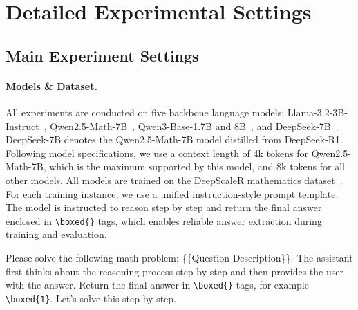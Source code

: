\section{Detailed Experimental Settings} 
\label{app:details}  
\subsection{Main Experiment Settings}
\paragraph{Models \& Dataset.} All experiments are conducted on five backbone language models: Llama-3.2-3B-Instruct~\citep{grattafiori2024llama3herdmodels}, Qwen2.5-Math-7B~\citep{yang2024qwen25mathtechnicalreportmathematical}, Qwen3-Base-1.7B and 8B~\citep{yang2025qwen3technicalreport}, and DeepSeek-7B~\citep{shao2024deepseekmathpushinglimitsmathematical}. DeepSeek-7B denotes the Qwen2.5-Math-7B model distilled from DeepSeek-R1. Following model specifications, we use a context length of 4k tokens for Qwen2.5-Math-7B, which is the maximum supported by this model, and 8k tokens for all other models. All models are trained on the DeepScaleR mathematics dataset~\citep{sun2025improvingdataefficiencyllm}. For each training instance, we use a unified instruction-style prompt template. The model is instructed to reason step by step and return the final answer enclosed in \verb|\boxed{}| tags, which enables reliable answer extraction during training and evaluation.  
\begin{tcolorbox}[ colback=gray!5, colframe=black, coltitle=white, title=\textbf{Prompt Template}, fonttitle=\bfseries, arc=6pt, boxrule=1pt, left=8pt, right=8pt, top=6pt, bottom=6pt ] Please solve the following math problem: \{\{Question Description\}\}. The assistant first thinks about the reasoning process step by step and then provides the user with the answer. Return the final answer in \verb|\boxed{}| tags, for example \verb|\boxed{1}|. Let's solve this step by step. 
\end{tcolorbox}  
\vspace{-0.6em}
